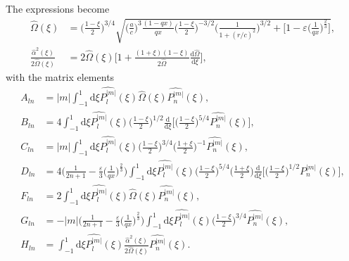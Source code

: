 \documentclass[11pt]{article}
\newcommand{\rd}{\mathrm{d}}
\newcommand{\Pnm}{P_n^{|m|}}
\newcommand{\Plm}{P_l^{|m|}}
\newcommand{\hPnm}{\widehat{\Pnm}}
\newcommand{\hPlm}{\widehat{\Plm}}
\newcommand{\hOmega}{\widehat{\Omega}}
\newcommand{\halpha}{\widehat{\alpha}}
\begin{document}
The expressions become
\begin{align*}
\hOmega(\xi) &=\bigg(\frac{1-\xi}{2}\bigg)^{3/4}  \sqrt{\bigg( \frac{a}{c}\bigg)^3\frac{(1-qx)}{qx} \bigg(\frac{1-\xi}{2}\bigg)^{-3/2} \bigg(\frac{1}{1+(r/c)^2}\bigg)^{3/2} 
+   \bigg[1- \varepsilon\bigg(\frac{1}{qx}\bigg)^{\frac{2}{3}} \bigg]  } , \\
\frac{\halpha^2(\xi)}{2\hOmega(\xi)} & = 2\hOmega(\xi) \bigg[1+\frac{(1+\xi)(1-\xi)}{2\hOmega}\frac{\rd \hOmega }{\rd \xi} \bigg],
\end{align*}
with the matrix elements
\begin{align*}
A_{ln} &= |m| \int_{-1}^{1} \rd \xi  \hPlm(\xi)\hOmega(\xi)\hPnm(\xi) , \\
B_{ln} &= 4 \int_{-1}^{1} \rd \xi  \hPlm(\xi) \bigg(\frac{1-\xi}{2}\bigg)^{1/2} \frac{\rd}{\rd \xi} \bigg[\bigg(\frac{1-\xi}{2}\bigg)^{5/4}\hPnm(\xi)\bigg], \\
C_{ln} &= |m| \int_{-1}^{1} \rd \xi \hPlm(\xi) \bigg(\frac{1-\xi}{2}\bigg)^{3/4}\bigg(\frac{1+\xi}{2}\bigg)^{-1}   \hPnm(\xi), \\
D_{ln} &= 4 \bigg(\frac{1}{2n+1}-\frac{\varepsilon}{3}  \bigg(\frac{1}{qx}\bigg)^{\frac{2}{3}} \bigg) \int_{-1}^{1} \rd \xi \hPlm(\xi)  \bigg(\frac{1-\xi}{2}\bigg)^{5/4} \bigg(\frac{1+\xi}{2}\bigg) 
\frac{\rd}{\rd \xi} \bigg[ \bigg(\frac{1-\xi}{2}\bigg)^{1/2}\hPnm(\xi) \bigg] ,\\
F_{ln} &=2 \int_{-1}^{1} \rd \xi  \hPlm(\xi)\hOmega(\xi)\hPnm(\xi) , \\
G_{ln} &= -|m| \bigg(\frac{1}{2n+1}-\frac{\varepsilon}{3}  \bigg(\frac{1}{qx}\bigg)^{\frac{2}{3}} \bigg)  \int_{-1}^{1} \rd \xi \hPlm(\xi)  \bigg(\frac{1-\xi}{2}\bigg)^{3/4} 
\hPnm(\xi)  ,\\
H_{ln} &=  \int_{-1}^{1} \rd \xi  \hPlm(\xi)\frac{\halpha^2(\xi)}{2\hOmega(\xi)}\hPnm(\xi) .
\end{align*}
\end{document}
